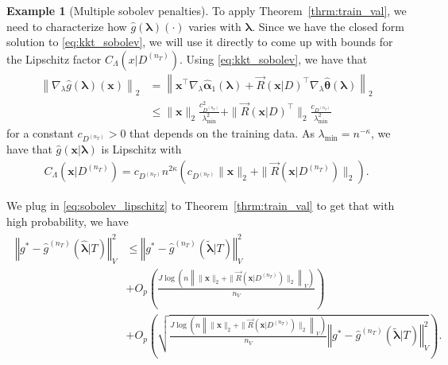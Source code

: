 \documentclass[12pt]{article} %
\theoremstyle{definition}
\newtheorem{example}{Example}
\begin{document}
\begin{example}[Multiple sobolev penalties]
	To apply Theorem~\ref{thrm:train_val}, we need to characterize how $\hat{g}(\boldsymbol{\lambda})(\cdot)$ varies with $\boldsymbol{\lambda}$.
	Since we have the closed form solution to \eqref{eq:kkt_sobolev}, we will use it directly to come up with bounds for the Lipschitz factor $C_\Lambda(x | D^{(n_T)})$.
	Using \eqref{eq:kkt_sobolev}, we have that
	\begin{align}
	\left \|
	\nabla_{\lambda} \hat{g}(\boldsymbol{\lambda})(\boldsymbol{x})
	\right \|_2
	& =
	\left \|
	\boldsymbol{x}^\top
	\nabla_{\lambda} \hat{\boldsymbol{\alpha}}_1(\boldsymbol{\lambda})
	+ \vec{R}(\boldsymbol{x} | D)^\top
	\nabla_{\lambda} \hat{\boldsymbol{\theta}}(\boldsymbol{\lambda})
	\right \|_2\\
	& \le
	\|\boldsymbol{x}\|_2
	\frac{c_{D^{(n_T)}}^2}{\lambda_{\min}^2}
	+ \|\vec{R}(\boldsymbol{x} | D)^\top\|_2
	\frac{c_{D^{(n_T)}}}{\lambda_{\min}^2}
	\end{align}
	for a constant $c_{D^{(n_T)}} > 0$ that depends on the training data.
	As $\lambda_{\min} = n^{-\kappa}$, we have that $\hat{g}(\boldsymbol{x}|\boldsymbol{\lambda})$ is Lipschitz with
	\begin{align}
	C_\Lambda(\boldsymbol{x} | D^{(n_T)})
	=
	c_{D^{(n_T)}}
	n^{2\kappa}
	\left(
	c_{D^{(n_T)}} \|\boldsymbol{x}\|_2
	+ \|\vec{R}(\boldsymbol{x}| D^{(n_T)}) \|_2
	\right).
	\label{eq:sobolev_lipschitz}
	\end{align}
	
	We plug in \eqref{eq:sobolev_lipschitz} to Theorem~\ref{thrm:train_val} to get that with high probability, we have
	\begin{align}
	\begin{split}
	\left\Vert g^* - \hat{g}^{(n_T)}( \hat{\boldsymbol{\lambda}} | T) \right\Vert _{V}^2
	&\le \left\Vert g^* - \hat{g}^{(n_T)}( \tilde{\boldsymbol{\lambda}} | T) \right \Vert^2_{V}\\
	& + O_p \left(\frac{J\log \left (n
		\left \|
		\|\boldsymbol{x}\|_2
		+ \|\vec{R}(\boldsymbol{x}| D^{(n_T)}) \|_2
		\right \|_V
		\right )}{n_{V}} \right)
	\\
	& + O_p \left(
	\sqrt{
		\frac{J\log \left (n
			\left \|
			\|\boldsymbol{x}\|_2
			+ \|\vec{R}(\boldsymbol{x}| D^{(n_T)}) \|_2
			\right \|_V
			\right )}{n_{V}}
		\left\Vert g^* - \hat{g}^{(n_T)}( \tilde{\boldsymbol{\lambda}}| T) \right \Vert^2_{V}
	}
	\right ).
	\end{split}
	\end{align}
\end{example}
\end{document}

